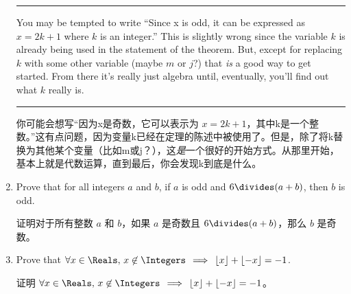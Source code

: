 \begin{enumerate}
{    \vfill
    
    \rule{12pt}{0pt} You may be tempted to write ``Since x is odd, it can be expressed as $x = 2k+1$ where $k$ is an integer.'' This is slightly wrong since the variable $k$ is already being used in the statement of the theorem.
    But, except for replacing $k$ with some other variable (maybe $m$ or $j$?) that {\em is} a good way to get started.
    From there it's really just algebra until, eventually, you'll find out what $k$ really is.
    
    \rule{12pt}{0pt} 你可能会想写“因为x是奇数，它可以表示为 $x = 2k+1$，其中k是一个整数。”这有点问题，因为变量k已经在定理的陈述中被使用了。但是，除了将k替换为其他某个变量（比如m或j？），这{\em 是}一个很好的开始方式。从那里开始，基本上就是代数运算，直到最后，你会发现k到底是什么。
    \vfill
    
    }
    \wbvfill
    
    \item Prove that for all integers $a$ and $b$, if $a$ is odd and $6 \divides (a+b)$, then $b$ is odd.
    
    证明对于所有整数 $a$ 和 $b$，如果 $a$ 是奇数且 $6 \divides (a+b)$，那么 $b$ 是奇数。
    \wbvfill
    
    \workbookpagebreak
    
    \item Prove that $\forall x\in\Reals, \, x\not\in\Integers \, \implies \, \lfloor x\rfloor+\lfloor-x\rfloor=-1$.
    
    证明 $\forall x\in\Reals, \, x\not\in\Integers \, \implies \, \lfloor x\rfloor+\lfloor-x\rfloor=-1$。
\end{enumerate}
